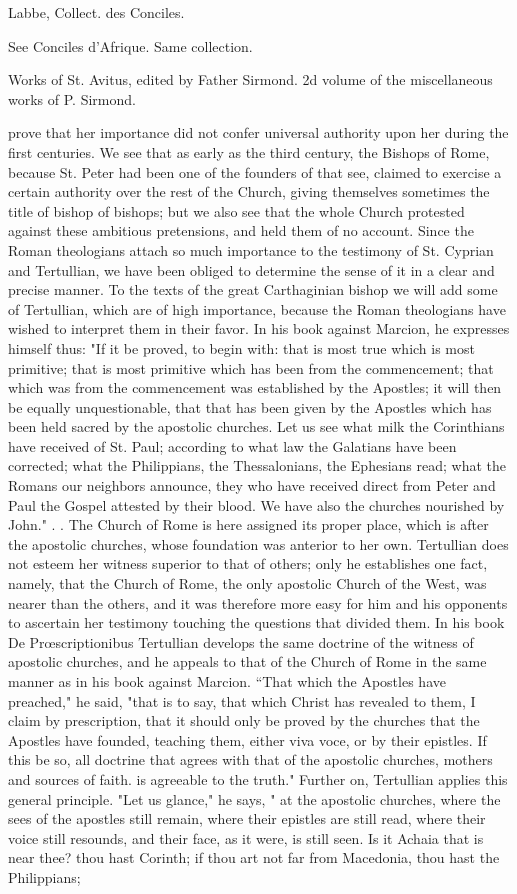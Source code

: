 Labbe, Collect. des Conciles.

See Conciles d'Afrique. Same collection.

Works of St. Avitus, edited by Father Sirmond. 2d volume of the miscellaneous works of P. Sirmond.

prove that her importance did not confer universal authority upon her during the first centuries. We see that as early as the third century, the Bishops of Rome, because St. Peter had been one of the founders of that see, claimed to exercise a certain authority over the rest of the Church, giving themselves sometimes the title of bishop of bishops; but we also see that the whole Church protested against these ambitious pretensions, and held them of no account. Since the Roman theologians attach so much importance to the testimony of St. Cyprian and Tertullian, we have been obliged to determine the sense of it in a clear and precise manner. To the texts of the great Carthaginian bishop we will add some of Tertullian, which are of high importance, because the Roman theologians have wished to interpret them in their favor. In his book against Marcion, he expresses himself thus: "If it be proved, to begin with: that is most true which is most primitive; that is most primitive which has been from the commencement; that which was from the commencement was established by the Apostles; it will then be equally unquestionable, that that has been given by the Apostles which has been held sacred by the apostolic churches. Let us see what milk the Corinthians have received of St. Paul; according to what law the Galatians have been corrected; what the Philippians, the Thessalonians, the Ephesians read; what the Romans our neighbors announce, they who have received direct from Peter and Paul the Gospel attested by their blood. We have also the churches nourished by John." . . The Church of Rome is here assigned its proper place, which is after the apostolic churches, whose foundation was anterior to her own. Tertullian does not esteem her witness superior to that of others; only he establishes one fact, namely, that the Church of Rome, the only apostolic Church of the West, was nearer than the others, and it was therefore more easy for him and his opponents to ascertain her testimony touching the questions that divided them. In his book De Prœscriptionibus Tertullian develops the same doctrine of the witness of apostolic churches, and he appeals to that of the Church of Rome in the same manner as in his book against Marcion. “That which the Apostles have preached," he said, "that is to say, that which Christ has revealed to them, I claim by prescription, that it should only be proved by the churches that the Apostles have founded, teaching them, either viva voce, or by their epistles. If this be so, all doctrine that agrees with that of the apostolic churches, mothers and sources of faith. is agreeable to the truth." Further on, Tertullian applies this general principle. "Let us glance," he says, " at the apostolic churches, where the sees of the apostles still remain, where their epistles are still read, where their voice still resounds, and their face, as it were, is still seen. Is it Achaia that is near thee? thou hast Corinth; if thou art not far from Macedonia, thou hast the Philippians; 